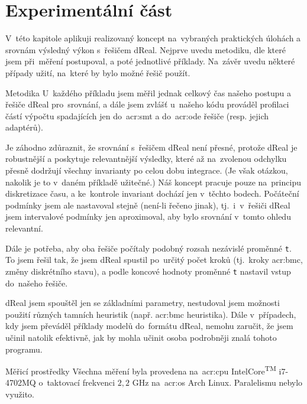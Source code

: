 \documentclass[thesis=M,czech]{FITthesis}[2012/06/26]
\newcommand{\acrlabel}[1]{acr:#1}
\newcommand{\acr}[1]{\acrshort{\acrlabel{#1}}}
\newcommand{\id}[1]{\texttt{#1}}
\newcommand{\reg}{\textsuperscript{\textregistered}}
\begin{document}
\chapter{Experimentální část}\label{ch:exp}
V~této kapitole aplikuji realizovaný koncept
na~vybraných praktických úlohách
a srovnám výsledný výkon s~řešičem dReal.
Nejprve uvedu metodiku,
dle které jsem při~měření postupoval,
a poté jednotlivé příklady.
Na~závěr uvedu některé případy užití,
na~které by bylo možné řešič použít.


\begin{section}{Metodika}\label{s:exp:method}
U~každého příkladu jsem měřil jednak celkový čas
našeho postupu a řešiče dReal pro~srovnání,
a dále jsem zvlášť u~našeho kódu prováděl
profilaci částí výpočtu spadajících
jen do~\acr{smt} a do~\acr{ode} řešiče
(resp. jejich adaptérů).

Je záhodno zdůraznit, že srovnání
s~řešičem dReal není přesné,
protože dReal je robustnější a poskytuje
relevantnější výsledky, které až na~zvolenou odchylku
přesně dodržují všechny invarianty po celou dobu integrace.
(Je však otázkou, nakolik je to v~daném příkladě užitečné.)
Náš koncept pracuje pouze na~principu diskretizace času,
a ke~kontrole invariant dochází jen v~těchto bodech.
Počáteční podmínky jsem ale nastavoval stejně (není-li řečeno jinak),
tj.~i~v~řešiči dReal jsem intervalové podmínky jen aproximoval,
aby bylo srovnání v~tomto ohledu relevantní.

Dále je potřeba, aby oba řešiče počítaly
podobný rozsah nezávislé proměnné \id{t}.
To jsem řešil tak, že jsem dReal spustil
po~určitý počet kroků (tj.~kroky \acr{bmc}, změny diskrétního stavu),
a podle koncové hodnoty proměnné \id{t}
nastavil vstup do~našeho řešiče.

dReal jsem spouštěl jen se základními parametry,
nestudoval jsem možnosti použití různých tamních heuristik
(např. \acr{bmc} heuristika).
Dále v~případech, kdy jsem převáděl příklady modelů
do~formátu dReal, nemohu zaručit,
že jsem učinil natolik efektivně,
jak by mohla učinit osoba
podrobněji znalá tohoto programu.


\begin{subsection}{Měřicí prostředky}\label{ss:exp:method:resources}
Všechna měření byla provedena
na~\acr{cpu}
Intel\reg Core\textsuperscript{TM}
i7-4702MQ o~taktovací frekvenci $2{,}2$ GHz
na~\acr{os} Arch Linux.
Paralelismu nebylo využito.


\end{subsection}
\end{section}
\end{document}
